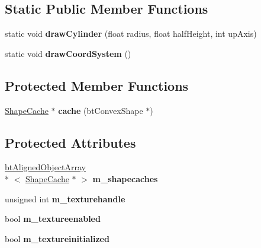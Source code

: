 \subsection*{Static Public Member Functions}
\begin{DoxyCompactItemize}
\item 
\hypertarget{class_g_l___shape_drawer_a22555dbf0612456df2f4ebd8c2900246}{static void {\bfseries draw\+Cylinder} (float radius, float half\+Height, int up\+Axis)}\label{class_g_l___shape_drawer_a22555dbf0612456df2f4ebd8c2900246}

\item 
\hypertarget{class_g_l___shape_drawer_af64502fc5c9fadb39c2b53ae2b36679a}{static void {\bfseries draw\+Coord\+System} ()}\label{class_g_l___shape_drawer_af64502fc5c9fadb39c2b53ae2b36679a}

\end{DoxyCompactItemize}
\subsection*{Protected Member Functions}
\begin{DoxyCompactItemize}
\item 
\hypertarget{class_g_l___shape_drawer_aebc2edd4cefc762c6caae46b870434f1}{\hyperlink{struct_g_l___shape_drawer_1_1_shape_cache}{Shape\+Cache} $\ast$ {\bfseries cache} (bt\+Convex\+Shape $\ast$)}\label{class_g_l___shape_drawer_aebc2edd4cefc762c6caae46b870434f1}

\end{DoxyCompactItemize}
\subsection*{Protected Attributes}
\begin{DoxyCompactItemize}
\item 
\hypertarget{class_g_l___shape_drawer_a062885ddb2436c07150ac0464370462f}{\hyperlink{classbt_aligned_object_array}{bt\+Aligned\+Object\+Array}\\*
$<$ \hyperlink{struct_g_l___shape_drawer_1_1_shape_cache}{Shape\+Cache} $\ast$ $>$ {\bfseries m\+\_\+shapecaches}}\label{class_g_l___shape_drawer_a062885ddb2436c07150ac0464370462f}

\item 
\hypertarget{class_g_l___shape_drawer_a415c93d031c08fc797cf708e33cba6d2}{unsigned int {\bfseries m\+\_\+texturehandle}}\label{class_g_l___shape_drawer_a415c93d031c08fc797cf708e33cba6d2}

\item 
\hypertarget{class_g_l___shape_drawer_a6d8934fcced6d1069f5243c8c62826b8}{bool {\bfseries m\+\_\+textureenabled}}\label{class_g_l___shape_drawer_a6d8934fcced6d1069f5243c8c62826b8}

\item 
\hypertarget{class_g_l___shape_drawer_a20f4fdc301078fec7c1bae9b7cb79310}{bool {\bfseries m\+\_\+textureinitialized}}\label{class_g_l___shape_drawer_a20f4fdc301078fec7c1bae9b7cb79310}

\end{DoxyCompactItemize}


